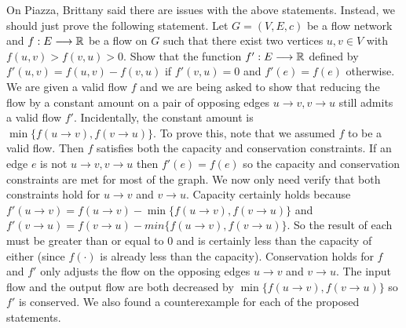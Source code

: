\documentclass{article}
\begin{document}
On Piazza, Brittany said there are issues with the above statements.
Instead, we should just prove the following statement.
Let $G = (V, E, c)$ be a flow network and $f: E \longrightarrow {\mathbb R}$ be a flow on $G$ such that there exist two vertices $u, v \in V$ with $f(u, v) > f(v, u) > 0$.
Show that the function $f': E \longrightarrow {\mathbb R}$ defined by $f'(u,v) = f(u,v) - f(v,u)$ if $f'(v,u) = 0$ and $f'(e) = f(e)$ otherwise. \parspace
We are given a valid flow $f$ and we are being asked to show that reducing the flow by a constant amount on a pair of opposing edges  $u \to v, v \to u$ still admits a valid flow $f'$.
Incidentally, the constant amount is $\min \{ f(u \to v), f(v \to u) \}$.
To prove this, note that we assumed $f$ to be a valid flow.
Then $f$ satisfies both the capacity and conservation constraints.
If an edge $e$ is not $u \to v, v \to u$ then $f'(e) = f(e)$ so the capacity and conservation constraints are met for most of the graph.
We now only need verify that both constraints hold for $u \to v$ and $v \to u$.
Capacity certainly holds because $f'(u \to v) = f(u \to v) - \min \{ f(u \to v), f(v \to u) \}$ and $f'(v \to u) = f(v \to u) - min \{ f(u \to v), f(v \to u) \}$.
So the result of each must be greater than or equal to 0 and is certainly less than the capacity of either (since $f(\cdot)$ is already less than the capacity).
Conservation holds for $f$ and $f'$ only adjusts the flow on the opposing edges $u \to v$ and $v \to u$.
The input flow and the output flow are both decreased by $\min \{ f(u \to v), f(v \to u) \}$ so $f'$ is conserved.
We also found a counterexample for each of the proposed statements.
\end{document}
